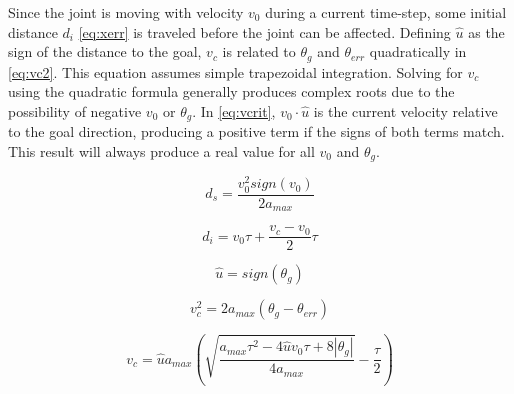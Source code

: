 Since the joint is moving with velocity $v_0$ during a current time-step, some
initial distance $d_{i}$ \eqref{eq:xerr} is traveled before the joint can be
affected. Defining $\hat{u}$ as the sign of the distance to the goal, $v_c$ is
related to $\theta_g$ and $\theta_{err}$ quadratically in \eqref{eq:vc2}. This equation
assumes simple trapezoidal integration. Solving for $v_c$ using the quadratic
formula generally produces complex roots due to the possibility of negative
$v_0$ or $\theta_g$.  In \eqref{eq:vcrit}, $v_0\cdot\hat{u}$ is the current velocity
relative to the goal direction, producing a positive term if the signs of both
terms match. This result will always produce a real value for all $v_0$ and
$\theta_g$.

\begin{equation}
\label{eq:decdist}
d_s=\frac{v_0^2 sign(v_0)}{2 a_{max}}
\end{equation}

\begin{equation}
\label{eq:xerr}
d_{i}=v_0 \tau + \frac{v_c-v_0}{2}\tau
\end{equation}

\begin{equation}
\label{eq:uhat}
\hat{u}=sign(\theta_g)
\end{equation}


\begin{equation}
\label{eq:vc2}
v_c^2 = 2 a_{max} \left(\theta_g -\theta_{err} \right)
\end{equation}

\begin{equation}
\label{eq:vcrit}
v_c=\hat{u} a_{max} \left(\sqrt{\frac{a_{max} \tau^2 - 4 \hat{u} v_0 \tau+8 |\theta_g|}{4 a_{max}}} - \frac{ \tau }{2}\right)
\end{equation}
